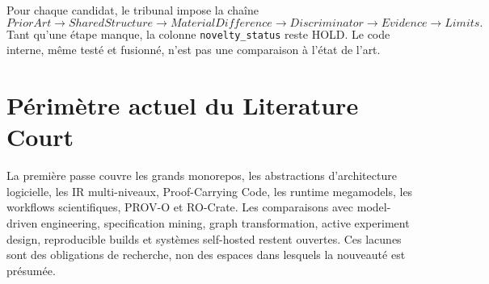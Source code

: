 Pour chaque candidat, le tribunal impose la chaîne
\[
PriorArt\rightarrow SharedStructure\rightarrow MaterialDifference\rightarrow Discriminator\rightarrow Evidence\rightarrow Limits.
\]
Tant qu'une étape manque, la colonne \texttt{novelty\_status} reste HOLD. Le code interne, même testé et fusionné, n'est pas une comparaison à l'état de l'art.

\section{Périmètre actuel du Literature Court}

La première passe couvre les grands monorepos, les abstractions d'architecture logicielle, les IR multi-niveaux, Proof-Carrying Code, les runtime megamodels, les workflows scientifiques, PROV-O et RO-Crate. Les comparaisons avec model-driven engineering, specification mining, graph transformation, active experiment design, reproducible builds et systèmes self-hosted restent ouvertes. Ces lacunes sont des obligations de recherche, non des espaces dans lesquels la nouveauté est présumée.
